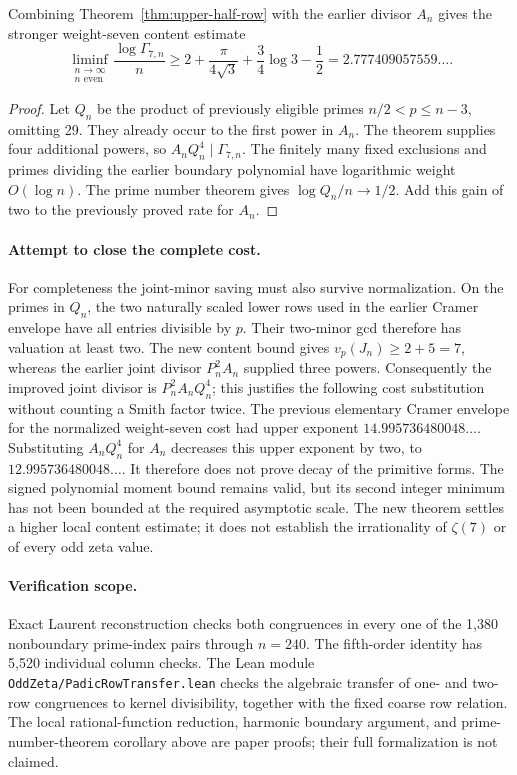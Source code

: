 \begin{corollary}
Combining Theorem~\ref{thm:upper-half-row} with the earlier divisor $A_n$
gives the stronger weight-seven content estimate
\[
 \liminf_{\substack{n\to\infty\\n\text{ even}}}
 \frac{\log\Gamma_{7,n}}n
 \ge 2+\frac{\pi}{4\sqrt3}+\frac34\log3-\frac12
 =2.777409057559\ldots .
\]
\end{corollary}
\begin{proof}
Let $Q_n$ be the product of previously eligible primes
$n/2<p\le n-3$, omitting 29. They already occur to the first power
in $A_n$. The theorem supplies four additional powers, so
$A_nQ_n^4\mid\Gamma_{7,n}$.
The finitely many fixed exclusions and primes dividing the earlier
boundary polynomial have logarithmic weight $O(\log n)$.
The prime number theorem gives $\log Q_n/n\to1/2$.
Add this gain of two to the previously proved rate for $A_n$.
\end{proof}

\paragraph{Attempt to close the complete cost.}
For completeness the joint-minor saving must also survive normalization.
On the primes in $Q_n$, the two naturally scaled lower rows used in the
earlier Cramer envelope have all entries divisible by $p$.
Their two-minor gcd therefore has valuation at least two.
The new content bound gives $v_p(J_n)\ge2+5=7$, whereas the earlier
joint divisor $P_n^2A_n$ supplied three powers.
Consequently the improved joint divisor is $P_n^2A_nQ_n^4$;
this justifies the following cost substitution without counting a Smith
factor twice.
The previous elementary Cramer envelope for the normalized weight-seven
cost had upper exponent $14.995736480048\ldots$.
Substituting $A_nQ_n^4$ for $A_n$ decreases this upper exponent by two,
to $12.995736480048\ldots$.
It therefore does not prove decay of the primitive forms.
The signed polynomial moment bound remains valid, but its second integer
minimum has not been bounded at the required asymptotic scale.
The new theorem settles a higher local content estimate; it does not
establish the irrationality of $\zeta(7)$ or of every odd zeta value.

\paragraph{Verification scope.}
Exact Laurent reconstruction checks both congruences in every one of
the 1,380 nonboundary prime-index pairs through $n=240$.
The fifth-order identity has 5,520 individual column checks.
The Lean module \texttt{OddZeta/PadicRowTransfer.lean} checks the algebraic
transfer of one- and two-row congruences to kernel divisibility, together
with the fixed coarse row relation. The local rational-function reduction,
harmonic boundary argument, and prime-number-theorem corollary above are
paper proofs; their full formalization is not claimed.
